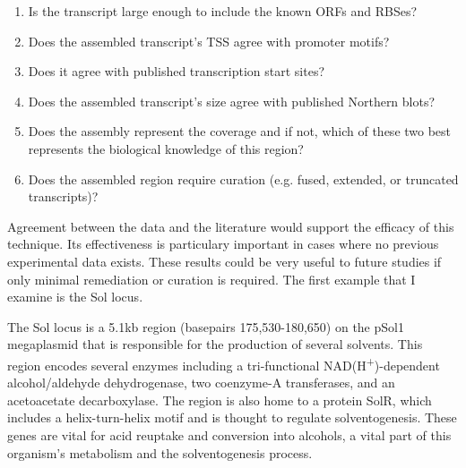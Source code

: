 \begin{enumerate}
\item Is the transcript large enough to include the known ORFs and RBSes?
\item Does the assembled transcript's TSS agree with promoter motifs?
\item Does it agree with published transcription start sites?
\item Does the assembled transcript's size agree with published Northern blots?
\item Does the assembly represent the coverage and if not, which of these two best represents the biological knowledge of this region?
\item Does the assembled region require curation (e.g. fused, extended, or truncated transcripts)?
\end{enumerate}

Agreement between the data and the literature would support the efficacy of this technique. Its effectiveness is particulary important in cases where no previous experimental data exists. These results could be very useful to future studies if only minimal remediation or curation is required. The first example that I examine is the Sol locus.

The Sol locus is a 5.1kb region (basepairs 175,530-180,650) on the pSol1 megaplasmid that is responsible for the production of several solvents. This region encodes several enzymes including a tri-functional NAD(H\textsuperscript{+})-dependent alcohol/aldehyde dehydrogenase, two coenzyme-A transferases, and an acetoacetate decarboxylase. The region is also home to a protein SolR, which includes a helix-turn-helix motif and is thought to regulate solventogenesis. These genes are vital for acid reuptake and conversion into alcohols, a vital part of this organism's metabolism and the solventogenesis process.


